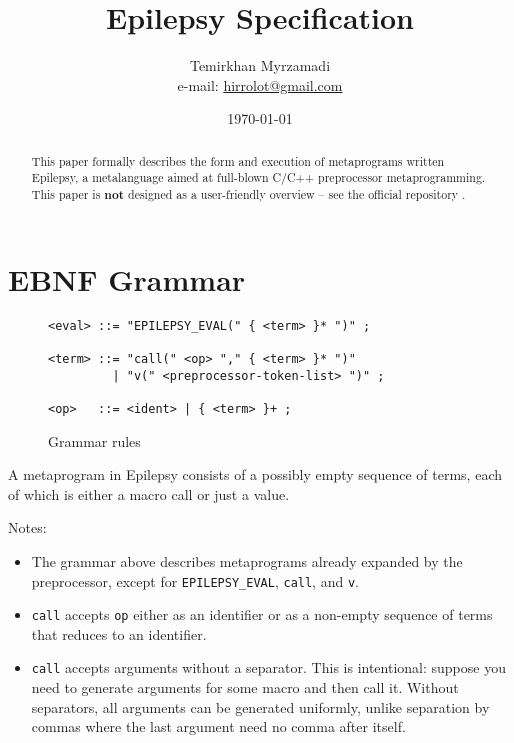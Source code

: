 \documentclass[12pt]{article}
\theoremstyle{break}
\begin{document}
\title{Epilepsy Specification}
\date{\today}
\author{Temirkhan Myrzamadi \\ e-mail: \href{mailto:hirrolot@gmail.com}{hirrolot@gmail.com}}
\maketitle

\begin{abstract}
This paper formally describes the form and execution of metaprograms written
Epilepsy, a metalanguage aimed at full-blown C/C++ preprocessor metaprogramming. This paper
is \textbf{not} designed as a user-friendly overview -- see the official repository
\cite{Epilepsy}.
\end{abstract}

\tableofcontents

\newpage

\section{EBNF Grammar}

\begin{figure}[H]
    \caption{Grammar rules}

\begin{verbatim}
<eval> ::= "EPILEPSY_EVAL(" { <term> }* ")" ;

<term> ::= "call(" <op> "," { <term> }* ")"
         | "v(" <preprocessor-token-list> ")" ;

<op>   ::= <ident> | { <term> }+ ;
\end{verbatim}

\end{figure}

A metaprogram in Epilepsy consists of a possibly empty sequence of terms, each of which
is either a macro call or just a value.

Notes:

\begin{itemize}
    \item The grammar above describes metaprograms already expanded by the preprocessor,
    except for \texttt{EPILEPSY\_EVAL}, \texttt{call}, and \texttt{v}.
    \item \texttt{call} accepts \texttt{op} either as an identifier or as a non-empty
    sequence of terms that reduces to an identifier.
    \item \texttt{call} accepts arguments without a separator. This is intentional: suppose
    you need to generate arguments for some macro and then call it. Without separators, all
    arguments can be generated uniformly, unlike separation by commas where the last argument
    need no comma after itself.
\end{itemize}
\end{document}

